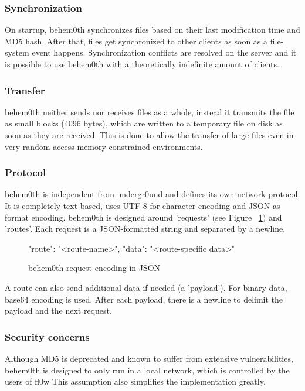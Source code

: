 \documentclass[conference,a4paper]{IEEEtran}
\begin{document}
\subsubsection{Synchronization}
On startup, behem0th synchronizes files based on their last modification time and MD5 hash. After that, files get synchronized to other clients as soon as a file-system event happens. Synchronization conflicts are resolved on the server and it is possible to use behem0th with a theoretically indefinite amount of clients.\\

\subsubsection{Transfer}
behem0th neither sends nor receives files as a whole, instead it transmits the file as small blocks (4096 bytes), which are written to a temporary file on disk as soon as they are received. This is done to allow the transfer of large files even in very random-access-memory-constrained environments.\\

\subsubsection{Protocol}
behem0th is independent from undergr0und and defines its own network protocol. It is completely text-based, uses UTF-8 for character encoding and JSON as format encoding. behem0th is designed around 'requests' $($see Figure ~\ref{fig:behem0th_request}$)$ and 'routes'. Each request is a JSON-formatted string and separated by a newline.

\begin{figure}[H]
\centering
\begin{json}
{
    "route": "<route-name>",
    "data": "<route-specific data>"
}
\end{json}
\caption{behem0th request encoding in JSON}
\label{fig:behem0th_request}
\end{figure}

A route can also send additional data if needed (a 'payload'). For binary data, base64\cite{Base64:S. Josefsson} encoding is used. After each payload, there is a newline to delimit the payload and the next request. \\

\subsubsection{Security concerns}
Although MD5 is deprecated and known to suffer from extensive vulnerabilities, behem0th is designed to only run in a local network, which is controlled by the users of fl0w This assumption also simplifies the implementation greatly.
\end{document}
